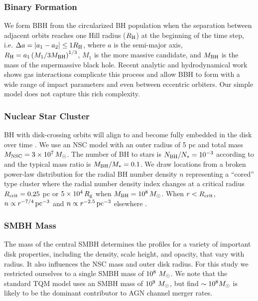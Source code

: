\subsubsection{Binary Formation}
We form BBH from the circularized BH population when the separation between adjacent orbits reaches one Hill radius ($R_{\rm H}$) at the beginning of the time step, i.e. $\Delta a = |a_1-a_2| \leq 1R_{\rm H}$, where $a$ is the semi-major axis, $R_{\rm H} = a_1 \left( M_1/3M_{\rm BH} \right)^{1/3}$, $M_1$ is the more massive candidate, and $M_{\rm BH}$ is the mass of the supermassive black hole.
Recent analytic \citep{QianLiLai24, DodiciTremaine24} and hydrodynamical work \citep{DeLaurentiis+23, Whitehead+24} shows gas interactions complicate this process and allow BBH to form with a wide range of impact parameters and even between eccentric orbiters.
Our simple model does not capture this rich complexity.

\subsubsection{Nuclear Star Cluster}
BH with disk-crossing orbits will align to and become fully embedded in the disk over time \citep{Fabj+20,Nasim+22,McKernan+22-starfall,WangZhuLin24}.
We use an NSC model with an outer radius of 5 pc and total mass $M_{\rm NSC}=3 \times 10^7\,M_{\odot}$.
The number of BH to stars is $N_{\rm BH}/N_{*} = 10^{-3}$ according to \citet{Generozov+18} and the typical mass ratio is $M_{\rm BH}/M_{*} = 0.1$.
We draw locations from a broken power-law distribution for the radial BH number density $n$ representing a ``cored'' type cluster where the radial number density index changes at a critical radius $R_{\rm crit}=0.25$ pc or $5\times10^4\,R_{\rm g}$ when $M_{\rm BH}=10^8\,M_{\odot}$.
When $r<R_{\rm crit}$, $n\propto r^{-7/4}\,{\rm pc}^{-3}$ and $n\propto r^{-2.5}\,{\rm pc}^{-3}$ elsewhere \citep{BachallWolf76,Generozov+18}.

\subsubsection{SMBH Mass}
\label{sec:smbh-mass}
The mass of the central SMBH determines the profiles for a variety of important disk properties, including the density, scale height, and opacity, that vary with radius.
It also influences the NSC mass and outer disk radius.
For this study we restricted ourselves to a single SMBH mass of $10^8~M_{\odot}$.
We note that the standard TQM model uses an SMBH mass of $10^9~M_{\odot}$, but \citet{Delfavero+25-mcfactsIII} find $\sim 10^{8}M_{\odot}$ is likely to be the dominant contributor to AGN channel merger rates.

